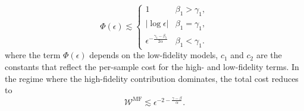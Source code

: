 \begin{theorem}
\begin{equation}
\Phi(\epsilon) \lesssim \begin{cases} 
1 & \beta_1 > \gamma_1, \\
|\log \epsilon| & \beta_1 = \gamma_1, \\
\epsilon^{-\frac{\gamma_1 - \beta_1}{2\alpha}} & \beta_1 < \gamma_1.
\end{cases}
\end{equation}
%
where the term $\Phi(\epsilon)$ depends on the low-fidelity models, $c_1$ and $c_2$ are the constants that reflect the per-sample cost for the high- and low-fidelity terms. In the regime where the high-fidelity contribution dominates, the total cost reduces to
%
\[
\mathcal{W}^{\mathrm{MF}} \lesssim \epsilon^{-2 - \frac{\gamma-\beta}{\alpha}}.
\]
%
\end{theorem}










